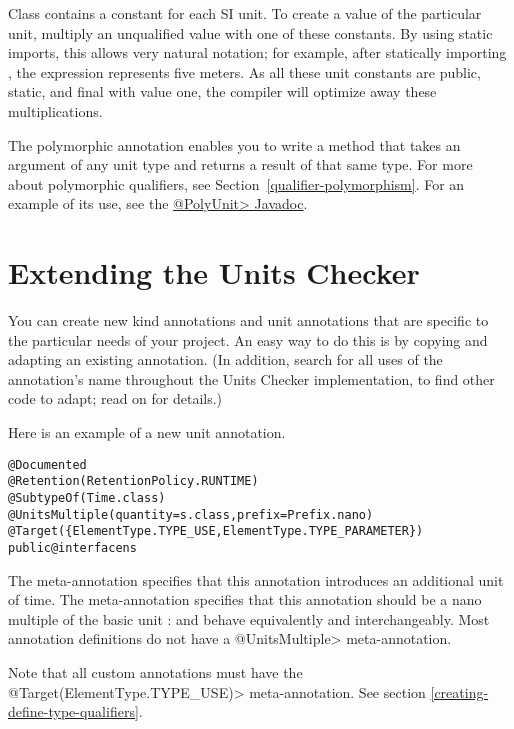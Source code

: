 Class  contains a constant for each SI unit.
To create a value of the particular unit, multiply an unqualified
value with one of these constants.
By using static imports, this allows very natural notation; for
example, after statically importing ,
the expression  represents five meters.
As all these unit constants are public, static, and final with value
one, the compiler will optimize away these multiplications.


The polymorphic annotation 
enables you to write a method that takes an argument of any unit type and
returns a result of that same type.  For more about polymorphic qualifiers,
see Section~\ref{qualifier-polymorphism}.  For an example of its use, see
the
\href{../api/org/checkerframework/checker/units/qual/PolyUnit.html}{\<@PolyUnit>
Javadoc}.


\section{Extending the Units Checker\label{extending-units}}

You can create new kind annotations and unit annotations that are specific
to the particular needs of your project.  An easy way to do this is by
copying and adapting an existing annotation.  (In addition, search for all
uses of the annotation's name throughout the Units Checker implementation,
to find other code to adapt; read on for details.)

Here is an example of a new unit annotation.

\begin{alltt}
@Documented
@Retention(RetentionPolicy.RUNTIME)
@SubtypeOf(\ttlcb{}Time.class\ttrcb{})
@UnitsMultiple(quantity=s.class, prefix=Prefix.nano)
@Target(\{ElementType.TYPE_USE, ElementType.TYPE_PARAMETER\})
public @interface ns \ttlcb{}\ttrcb{}
\end{alltt}

The  meta-annotation specifies that this annotation
introduces an additional unit of time.
The  meta-annotation specifies that this annotation
should be a nano multiple of the basic unit :   and
behave equivalently and interchangeably.
Most annotation definitions do not have a \<@UnitsMultiple> meta-annotation.

Note that all custom annotations must have the
\<@Target({ElementType.TYPE\_USE})> meta-annotation. See section
\ref{creating-define-type-qualifiers}.

